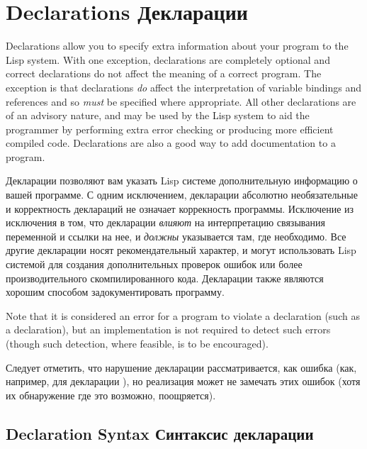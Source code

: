 
\clearpage\def\pagestatus{ULTIMATE}

\chapter{Declarations Декларации}
\label{DECLAR}

Declarations allow you to specify extra information about your program
to the Lisp system.  With one exception,
declarations are completely optional
and correct declarations do not affect the meaning
of a correct program.  The exception is that
 declarations \emph{do} affect the interpretation of variable
bindings and references and so \emph{must} be specified where appropriate.
All other declarations are of an advisory nature, and may be used
by the Lisp system to aid the programmer by performing extra error checking
or producing more efficient compiled code.  Declarations are also
a good way to add documentation to a program.

Декларации позволяют вам указать Lisp системе дополнительную информацию о вашей
программе. С одним исключением, декларации абсолютно необязательные и
корректность деклараций не означает коррекность программы. Исключение из
исключения в том, что декларации  \emph{влияют} на интерпретацию
связывания переменной и ссылки на нее, и \emph{должны} указывается там, где
необходимо.
Все другие декларации носят рекомендательный характер, и могут использовать Lisp
системой для создания дополнительных проверок ошибок или более производительного
скомпилированного кода. Декларации также являются хорошим способом
задокументировать программу.

Note that it is considered an error for a program to violate a
declaration (such as a  declaration), but an implementation is
not required to detect such errors (though such detection, where
feasible, is to be encouraged).

Следует отметить, что нарушение декларации рассматривается, как ошибка (как,
например, для декларации ), но реализация может не замечать этих
ошибок (хотя их обнаружение где это возможно, поощряется).

\section{Declaration Syntax Синтаксис декларации}
\label{DECLARE-SYNTAX-SECTION}

